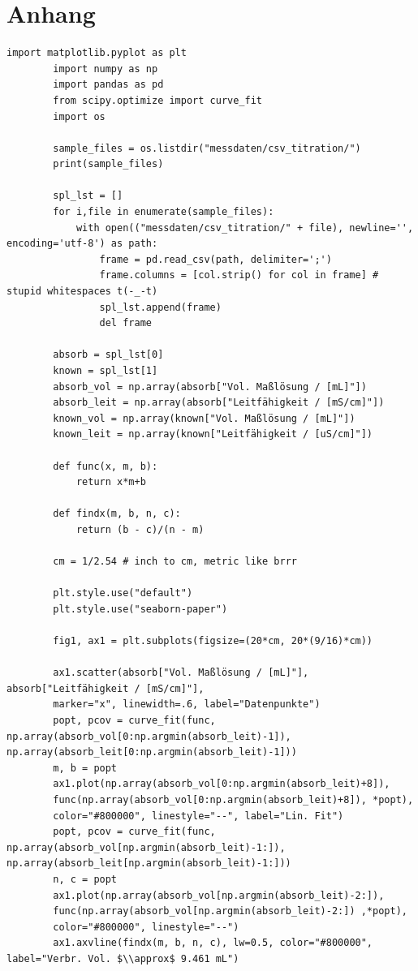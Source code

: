\chapter{Anhang}
	\begin{lstlisting}[style=python, caption={Zur Auswertung der konduktometrischen Titration verwendeter Python-Code.}]
		import matplotlib.pyplot as plt
		import numpy as np
		import pandas as pd
		from scipy.optimize import curve_fit
		import os

		sample_files = os.listdir("messdaten/csv_titration/")
		print(sample_files)

		spl_lst = []
		for i,file in enumerate(sample_files):
			with open(("messdaten/csv_titration/" + file), newline='', encoding='utf-8') as path:
				frame = pd.read_csv(path, delimiter=';')
				frame.columns = [col.strip() for col in frame] # stupid whitespaces t(-_-t)
				spl_lst.append(frame)
				del frame

		absorb = spl_lst[0]
		known = spl_lst[1]
		absorb_vol = np.array(absorb["Vol. Maßlösung / [mL]"])
		absorb_leit = np.array(absorb["Leitfähigkeit / [mS/cm]"])
		known_vol = np.array(known["Vol. Maßlösung / [mL]"])
		known_leit = np.array(known["Leitfähigkeit / [uS/cm]"])

		def func(x, m, b):
			return x*m+b

		def findx(m, b, n, c):
			return (b - c)/(n - m)

		cm = 1/2.54 # inch to cm, metric like brrr

		plt.style.use("default")
		plt.style.use("seaborn-paper")

		fig1, ax1 = plt.subplots(figsize=(20*cm, 20*(9/16)*cm))

		ax1.scatter(absorb["Vol. Maßlösung / [mL]"], absorb["Leitfähigkeit / [mS/cm]"],
		marker="x", linewidth=.6, label="Datenpunkte")
		popt, pcov = curve_fit(func, np.array(absorb_vol[0:np.argmin(absorb_leit)-1]), np.array(absorb_leit[0:np.argmin(absorb_leit)-1]))
		m, b = popt
		ax1.plot(np.array(absorb_vol[0:np.argmin(absorb_leit)+8]),
		func(np.array(absorb_vol[0:np.argmin(absorb_leit)+8]), *popt),
		color="#800000", linestyle="--", label="Lin. Fit")
		popt, pcov = curve_fit(func, np.array(absorb_vol[np.argmin(absorb_leit)-1:]), np.array(absorb_leit[np.argmin(absorb_leit)-1:]))
		n, c = popt
		ax1.plot(np.array(absorb_vol[np.argmin(absorb_leit)-2:]),
		func(np.array(absorb_vol[np.argmin(absorb_leit)-2:]) ,*popt),
		color="#800000", linestyle="--")
		ax1.axvline(findx(m, b, n, c), lw=0.5, color="#800000", label="Verbr. Vol. $\\approx$ 9.461 mL")


\end{lstlisting}
